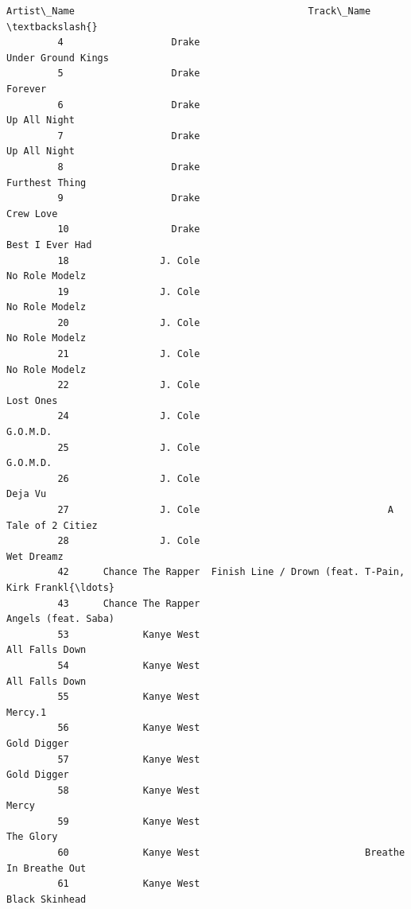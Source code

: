 \documentclass[11pt]{article}
\begin{document}
\begin{Verbatim}[commandchars=\\\{\}]
                       Artist\_Name                                         Track\_Name  \textbackslash{}
         4                   Drake                                 Under Ground Kings   
         5                   Drake                                            Forever   
         6                   Drake                                       Up All Night   
         7                   Drake                                       Up All Night   
         8                   Drake                                     Furthest Thing   
         9                   Drake                                          Crew Love   
         10                  Drake                                    Best I Ever Had   
         18                J. Cole                                     No Role Modelz   
         19                J. Cole                                     No Role Modelz   
         20                J. Cole                                     No Role Modelz   
         21                J. Cole                                     No Role Modelz   
         22                J. Cole                                          Lost Ones   
         24                J. Cole                                           G.O.M.D.   
         25                J. Cole                                           G.O.M.D.   
         26                J. Cole                                            Deja Vu   
         27                J. Cole                                 A Tale of 2 Citiez   
         28                J. Cole                                         Wet Dreamz   
         42      Chance The Rapper  Finish Line / Drown (feat. T-Pain, Kirk Frankl{\ldots}   
         43      Chance The Rapper                                Angels (feat. Saba)   
         53             Kanye West                                     All Falls Down   
         54             Kanye West                                     All Falls Down   
         55             Kanye West                                            Mercy.1   
         56             Kanye West                                        Gold Digger   
         57             Kanye West                                        Gold Digger   
         58             Kanye West                                              Mercy   
         59             Kanye West                                          The Glory   
         60             Kanye West                             Breathe In Breathe Out   
         61             Kanye West                                     Black Skinhead   

\end{Verbatim}
\end{document}
